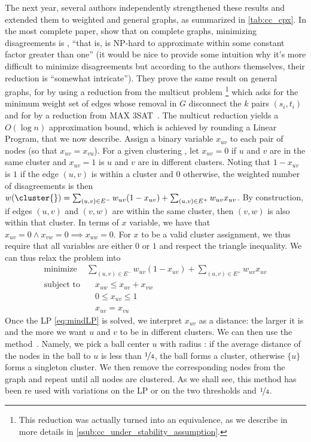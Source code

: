 The next year, several authors independently strengthened these results and extended them to
weighted and general graphs, as summarized in \autoref{tab:cc_cpx}. In the most complete paper,
\textcite{Charikar2003} show that on complete graphs, minimizing disagreements is \APXh{},
\enquote{that is, is NP-hard to approximate within some constant factor greater than one} (it would
be nice to provide some intuition why it's more difficult to minimize disagreements but according to
the authors themselves, their reduction is \enquote{somewhat intricate}). They prove the same result
on general graphs, for \mind{} by using a reduction from the multicut problem \autocite[Theorem
8]{Charikar2003}\footnote{This reduction was actually turned into an equivalence, as we describe
in more details in \autoref{ssub:cc_under_stability_assumption}.}
which asks for the minimum weight set of edges whose removal in $G$ disconnect the
$k$ pairs $(s_i, t_i)$ and for \maxa{} by a reduction from MAX 3SAT~\autocite[Theorem
9]{Charikar2003}. The multicut reduction yields a $O(\log n)$ approximation bound, which is achieved
by rounding a Linear Program, that we now describe. Assign a binary variable $x_{uv}$ to each pair
of nodes (so that $x_{uv}=x_{vu}$). For a given clustering \cluster{}, let $x_{uv} = 0$ if $u$ and
$v$ are in the same cluster and $x_{uv}=1$ is $u$ and $v$ are in different clusters. Noting that
$1-x_{uv}$ is $1$ if the edge $(u,v)$ is within a cluster and $0$ otherwise, the weighted
number of disagreements is then $w(\cluster{}) = \sum_{(u,v)\in E^-} w_{uv}(1-x_{uv}) +
\sum_{(u,v)\in E^+} w_{uv}x_{uv}$. By construction, if edges $(u,v)$ and $(v,w)$ are within the same
cluster, then $(v, w)$ is also within that cluster. In terms of $x$ variable, we have that $x_{uv}=0
\wedge x_{vw}=0 \implies x_{uw} = 0$. For $x$ to be a valid cluster assignment, we thus require that all
variables are either $0$ or $1$ and respect the triangle inequality. We can thus relax the problem into
\begin{align}
   \label{eq:mindLP}
   \text{minimize } & \sum_{(u,v)\in E^-} w_{uv}(1-x_{uv}) + \sum_{(u,v)\in E^+} w_{uv}x_{uv} \\
   \text{subject to}& \quad x_{uw} \leq x_{uv} + x_{vw} \nonumber\\
   \phantom{subject to}& \quad 0 \leq x_{uv} \leq 1  \nonumber \\
   \phantom{subject to}& \quad x_{uv} = x_{vu}  \nonumber
\end{align}
Once the LP \eqref{eq:mindLP} is solved, we interpret $x_{uv}$ as a distance: the larger it is and
the more we want $u$ and $v$ to be in different clusters. We can then use the \regionGrow{}
method~\autocite{RegionGrowing93}. Namely, we pick a ball center $u$ \uar{} with radius \shalf{}: if
the average distance of the nodes in the ball to $u$ is less than $\nicefrac{1}{4}$, the ball forms a
cluster, otherwise $\{u\}$ forms a singleton cluster. We then remove the corresponding nodes from
the graph and repeat until all nodes are clustered. As we shall see, this method has been re used
with variations on the LP or on the two thresholds \shalf{} and $\nicefrac{1}{4}$.

